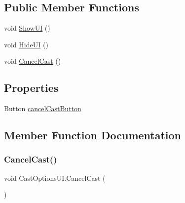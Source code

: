 \subsection*{Public Member Functions}
\begin{DoxyCompactItemize}
\item 
void \mbox{\hyperlink{class_cast_options_u_i_a37c4fa85c666ede5418cd5d7e524ce35}{Show\+UI}} ()
\item 
void \mbox{\hyperlink{class_cast_options_u_i_affc98e48b03c51f4dddda5cb96920697}{Hide\+UI}} ()
\item 
void \mbox{\hyperlink{class_cast_options_u_i_a78fb30f53f8da2443cb801bd878dc149}{Cancel\+Cast}} ()
\end{DoxyCompactItemize}
\subsection*{Properties}
\begin{DoxyCompactItemize}
\item 
Button \mbox{\hyperlink{class_cast_options_u_i_a88e0c5e435183c0f3912bd9eb5a6629f}{cancel\+Cast\+Button}}
\end{DoxyCompactItemize}


\subsection{Member Function Documentation}
\mbox{\label{class_cast_options_u_i_a78fb30f53f8da2443cb801bd878dc149}} 
\subsubsection{\texorpdfstring{CancelCast()}{CancelCast()}}
{\footnotesize\ttfamily void Cast\+Options\+U\+I.\+Cancel\+Cast (\begin{DoxyParamCaption}{ }\end{DoxyParamCaption})}

